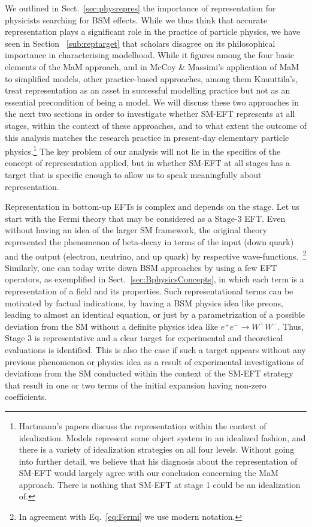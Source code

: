 We outlined in Sect.~\ref{sec:physrepres} the importance of representation for physicists searching for BSM effects. 
While we thus think that accurate representation plays a significant role in the practice of particle physics, we have seen in Section ~\ref{sub:reptarget} that scholars disagree on its philosophical importance in characterising modelhood. 
While it figures among the four basic elements of the MaM approach, and in McCoy \& Massimi's application of MaM to simplified models, other practice-based approaches, among them Knuuttila's, treat representation as an asset in successful modelling practice but not as an essential precondition of being a model. 
We will discuss these two approaches in the next two sections in order to investigate whether SM-EFT represents at all stages, within the context of these approaches, and to what extent the outcome of this analysis matches the research practice in present-day elementary particle physics.\footnote{Hartmann's papers discuss the representation within the context of idealization. Models represent some object system in an idealized fashion, and there is a variety of idealization strategies on all four levels. Without going into further detail, we believe that his diagnosis about the representation of SM-EFT would largely agree with our conclusion concerning the MaM approach. There is nothing that SM-EFT at stage 1 could be an idealization of.}
The key problem of our analysis will not lie in the specifics of the concept of representation applied, but in whether SM-EFT at all stages has a target that is specific enough to allow us to speak meaningfully about representation.


Representation in bottom-up EFTs is complex and depends on the stage.
Let us start with the Fermi theory that may be considered as a Stage-3 EFT. 
Even without having an idea of the larger SM framework, the original theory represented the phenomenon of beta-decay in terms of the input (down quark) and the output (electron, neutrino, and up quark) by respective wave-functions.~\footnote{In agreement with Eq.~\ref{eq:Fermi} we use modern notation.}
Similarly, one can today write down BSM approaches by using a few EFT operators, as exemplified in Sect.~\ref{sec:BphysicsConcepts}, in which each term is a representation of a field and its properties.
Such representational terms can be motivated by factual indications, by having a BSM physics idea like preons, leading to almost an identical equation, or just by a parametrization of a possible deviation from the SM without a definite physics idea like $e^+e^-\rightarrow W^+W^-$.
Thus, Stage 3 is representative and a clear target for experimental and theoretical evaluations is identified.
This is also the case if such a target appears without any previous phenomenon or physics idea as a result of experimental investigations of deviations from the SM conducted within the context of the SM-EFT strategy that result in one or two terms of the initial expansion having non-zero coefficients.

